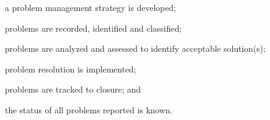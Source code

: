 			\begin{adjustwidth}{2em}{0pt} 

				\begin{compactitem}

					\item a problem management strategy is developed;

					\item problems are recorded, identified and classified;

					\item problems are analyzed and assessed to identify acceptable solution(s);

					\item problem resolution is implemented;

					\item problems are tracked to closure; and

					\item the status of all problems reported is known.

				\end{compactitem}

			\end{adjustwidth}

